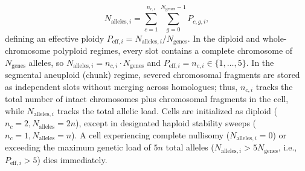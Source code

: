 \documentclass[11pt,a4paper]{article}
\begin{document}
\begin{itemize}
    \begin{equation}
        N_{\text{alleles}, i} = \sum_{c=1}^{n_{c, i}} \sum_{g=0}^{N_{\text{genes}}-1} P_{c, g, i},
    \end{equation}
    defining an effective ploidy $P_{\text{eff}, i} = N_{\text{alleles}, i} / N_{\text{genes}}$. In the diploid and whole-chromosome polyploid regimes, every slot contains a complete chromosome of $N_{\text{genes}}$ alleles, so $N_{\text{alleles}, i} = n_{c, i} \cdot N_{\text{genes}}$ and $P_{\text{eff}, i} = n_{c, i} \in \{1, \dots, 5\}$. In the segmental aneuploid (chunk) regime, severed chromosomal fragments are stored as independent slots without merging across homologues; thus, $n_{c, i}$ tracks the total number of intact chromosomes plus chromosomal fragments in the cell, while $N_{\text{alleles}, i}$ tracks the total allelic load. Cells are initialized as diploid ($n_c = 2, N_{\text{alleles}} = 2n$), except in designated haploid stability sweeps ($n_c = 1, N_{\text{alleles}} = n$). A cell experiencing complete nullisomy ($N_{\text{alleles}, i} = 0$) or exceeding the maximum genetic load of $5n$ total alleles ($N_{\text{alleles}, i} > 5 N_{\text{genes}}$, i.e., $P_{\text{eff}, i} > 5$) dies immediately.
\end{itemize}
\end{document}
